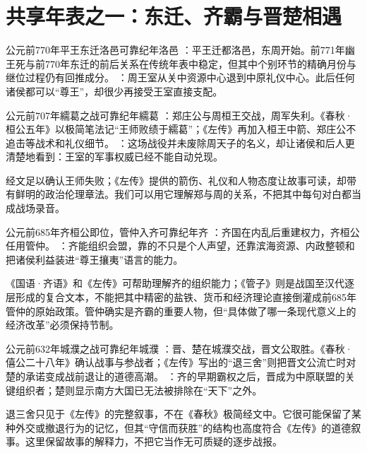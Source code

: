 \section{共享年表之一：东迁、齐霸与晋楚相遇}

\begin{event}{公元前770年}{平王东迁洛邑}{可靠纪年}{洛邑}
：平王迁都洛邑，东周开始。前771年幽王死与前770年东迁的前后关系在传统年表中稳定，但其中个别环节的精确月份与继位过程仍有回推成分。
：周王室从关中资源中心退到中原礼仪中心。此后任何诸侯都可以“尊王”，却很少再接受王室直接支配。
\end{event}

\begin{event}{公元前707年}{繻葛之战}{可靠纪年}{繻葛}
：郑庄公与周桓王交战，周军失利。《春秋·桓公五年》以极简笔法记“王师败绩于繻葛”；《左传》再加入桓王中箭、郑庄公不追击等战术和礼仪细节。
：这场战役并未废除周天子的名义，却让诸侯和后人更清楚地看到：王室的军事权威已经不能自动兑现。
\end{event}

\begin{sourcenote}[繻葛：经文与叙事的距离]
经文足以确认王师失败；《左传》提供的箭伤、礼仪和人物态度让故事可读，却带有鲜明的政治伦理章法。我们可以用它理解郑与周的关系，不把其中每句对白都当成战场录音。
\end{sourcenote}

\begin{event}{公元前685年}{齐桓公即位，管仲入齐}{可靠纪年}{齐}
：齐国在内乱后重建权力，齐桓公任用管仲。
：齐能组织会盟，靠的不只是个人声望，还靠滨海资源、内政整顿和把诸侯利益装进“尊王攘夷”语言的能力。
\end{event}

\begin{debate}[管仲改革能不能全信《管子》]
《国语·齐语》和《左传》可帮助理解齐的组织能力；《管子》则是战国至汉代逐层形成的复合文本，不能把其中精密的盐铁、货币和经济理论直接倒灌成前685年管仲的原始政策。管仲确实是齐霸的重要人物，但“具体做了哪一条现代意义上的经济改革”必须保持节制。
\end{debate}

\begin{event}{公元前632年}{城濮之战}{可靠纪年}{城濮}
：晋、楚在城濮交战，晋文公取胜。《春秋·僖公二十八年》确认战事与参战者；《左传》写出的“退三舍”则把晋文公流亡时对楚的承诺变成战前退让的道德高潮。
：齐的早期霸权之后，晋成为中原联盟的关键组织者；楚则显示南方大国已无法被排除在“天下”之外。
\end{event}

\begin{debate}
退三舍只见于《左传》的完整叙事，不在《春秋》极简经文中。它很可能保留了某种外交或撤退行为的记忆，但其“守信而获胜”的结构也高度符合《左传》的道德叙事。这里保留故事的解释力，不把它当作无可质疑的逐步战报。
\end{debate}
